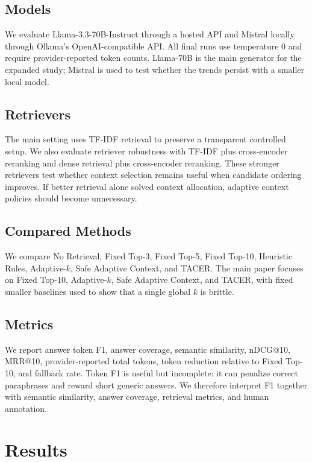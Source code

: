 \documentclass[11pt]{article}
\begin{document}
\subsection{Models}

We evaluate Llama-3.3-70B-Instruct through a hosted API and Mistral locally through Ollama's OpenAI-compatible API. All final runs use temperature 0 and require provider-reported token counts. Llama-70B is the main generator for the expanded study; Mistral is used to test whether the trends persist with a smaller local model.

\subsection{Retrievers}

The main setting uses TF-IDF retrieval to preserve a transparent controlled setup. We also evaluate retriever robustness with TF-IDF plus cross-encoder reranking and dense retrieval plus cross-encoder reranking. These stronger retrievers test whether context selection remains useful when candidate ordering improves. If better retrieval alone solved context allocation, adaptive context policies should become unnecessary.

\subsection{Compared Methods}

We compare No Retrieval, Fixed Top-3, Fixed Top-5, Fixed Top-10, Heuristic Rules, Adaptive-$k$, Safe Adaptive Context, and TACER. The main paper focuses on Fixed Top-10, Adaptive-$k$, Safe Adaptive Context, and TACER, with fixed smaller baselines used to show that a single global $k$ is brittle.

\subsection{Metrics}

We report answer token F1, answer coverage, semantic similarity, nDCG@10, MRR@10, provider-reported total tokens, token reduction relative to Fixed Top-10, and fallback rate. Token F1 is useful but incomplete: it can penalize correct paraphrases and reward short generic answers. We therefore interpret F1 together with semantic similarity, answer coverage, retrieval metrics, and human annotation.

\section{Results}
\end{document}
